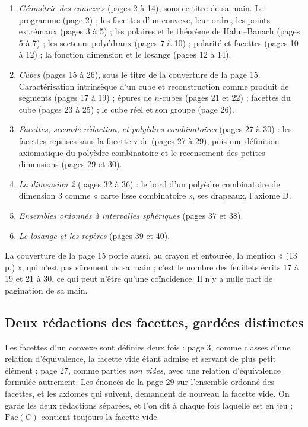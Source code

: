 \documentclass[11pt,a4paper]{article}
\begin{document}
\begin{enumerate}
\item[I.] \emph{Géométrie des convexes} (pages 2 à 14), sous ce titre de sa
main. Le programme (page 2) ; les facettes d'un convexe, leur ordre, les
points extrémaux (pages 3 à 5) ; les polaires et le théorème de Hahn--Banach
(pages 5 à 7) ; les secteurs polyédraux (pages 7 à 10) ; polarité et facettes
(pages 10 à 12) ; la fonction dimension et le losange (pages 12 à 14).
\item[II.] \emph{Cubes} (pages 15 à 26), sous le titre de la couverture de la
page 15. Caractérisation intrinsèque d'un cube et reconstruction comme produit
de segments (pages 17 à 19) ; épures de $n$-cubes (pages 21 et 22) ; facettes
du cube (pages 23 à 25) ; le cube réel et son groupe (page 26).
\item[III.] \emph{Facettes, seconde rédaction, et polyèdres combinatoires}
(pages 27 à 30) : les facettes reprises sans la facette vide (pages 27 à 29),
puis une définition axiomatique du polyèdre combinatoire et le recensement des
petites dimensions (pages 29 et 30).
\item[IV.] \emph{La dimension 2} (pages 32 à 36) : le bord d'un polyèdre
combinatoire de dimension 3 comme « carte lisse combinatoire », ses drapeaux,
l'axiome D.
\item[V.] \emph{Ensembles ordonnés à intervalles sphériques} (pages 37 et 38).
\item[VI.] \emph{Le losange et les repères} (pages 39 et 40).
\end{enumerate}

La couverture de la page 15 porte aussi, au crayon et entourée, la mention
« (13 p.) », qui n'est pas sûrement de sa main ; c'est le nombre des feuillets
écrits 17 à 19 et 21 à 30, ce qui peut n'être qu'une coïncidence. Il n'y a
nulle part de pagination de sa main.

\subsection*{Deux rédactions des facettes, gardées distinctes}

Les facettes d'un convexe sont définies deux fois : page 3, comme classes d'une
relation d'équivalence, la facette vide étant admise et servant de plus petit
élément ; page 27, comme parties \emph{non vides}, avec une relation
d'équivalence formulée autrement. Les énoncés de la page 29 sur l'ensemble
ordonné des facettes, et les axiomes qui suivent, demandent de nouveau la
facette vide. On garde les deux rédactions séparées, et l'on dit à chaque fois
laquelle est en jeu ; $\mathrm{Fac}(C)$ contient toujours la facette vide.
\end{document}
